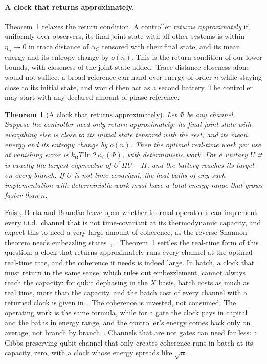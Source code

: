 \documentclass[11pt]{article}
\newtheorem{theorem}{Theorem}
\theoremstyle{definition}
\theoremstyle{remark}
\newcommand{\kB}{k_{\mathrm B}}
\newcommand{\Trt}{\kappa_\beta}
\begin{document}
\paragraph{A clock that returns approximately.} Theorem~\ref{thm:clock} relaxes the return condition. A controller \emph{returns approximately} if, uniformly over observers, its final joint state with all other systems is within $\eta_n\to0$ in trace distance of $\alpha_C$ tensored with their final state, and its mean energy and its entropy change by $o(n)$. This is the return condition of our lower bounds, with closeness of the joint state added. Trace-distance closeness alone would not suffice: a broad reference can hand over energy of order $n$ while staying close to its initial state, and would then act as a second battery. The controller may start with any declared amount of phase reference.

\begin{theorem}[A clock that returns approximately]\label{thm:clock}
Let $\Phi$ be any channel. Suppose the controller need only return approximately: its final joint state with everything else is close to its initial state tensored with the rest, and its mean energy and its entropy change by $o(n)$. Then the optimal real-time work per use at vanishing error is $\kB T\ln2\,\Trt(\Phi)$, with deterministic work. For a unitary $U$ it is exactly the largest eigenvalue of $U^*HU-H$, and the battery reaches its target on every branch. If $U$ is not time-covariant, the heat baths of any such implementation with deterministic work must have a total energy range that grows faster than $n$.
\end{theorem}

Faist, Berta and Brand\~ao leave open whether thermal operations can implement every i.i.d.\ channel that is not time-covariant at its thermodynamic capacity, and expect this to need a very large amount of coherence, as the reverse Shannon theorem needs embezzling states~\cite{FBB19},~\cite[Sec.~9]{FBB21}. Theorem~\ref{thm:clock} settles the real-time form of this question: a clock that returns approximately runs every channel at the optimal real-time rate, and the coherence it needs is indeed large. In batch, a clock that must return in the same sense, which rules out embezzlement, cannot always reach the capacity: for qubit dephasing in the $X$ basis, batch costs as much as real time, more than the capacity, and the batch cost of every channel with a returned clock is given in~\cite{KeepingTime}. The coherence is invested, not consumed. The operating work is the same formula, while for a gate the clock pays in capital~\cite{ChiribellaYangRenner21,TSS20} and the baths in energy range, and the controller's energy comes back only on average, not branch by branch~\cite{KeepingTime}. Channels that are not gates can need far less: a Gibbs-preserving qubit channel that only creates coherence runs in batch at its capacity, zero, with a clock whose energy spreads like $\sqrt n$~\cite{KeepingTime}.
\end{document}
